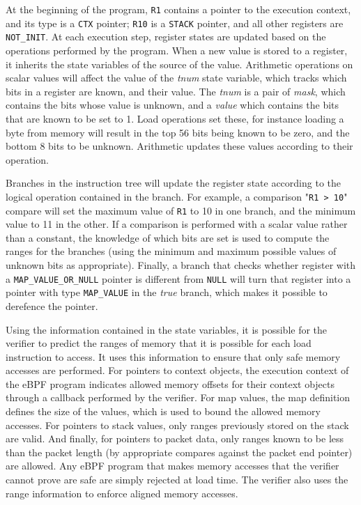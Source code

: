 \documentclass[10pt,sigconf]{acmart}
\begin{document}
At the beginning of the program, \texttt{R1} contains a pointer to the execution
context, and its type is a \texttt{CTX} pointer; \texttt{R10} is a \texttt{STACK}
pointer, and all other registers are \texttt{NOT\_INIT}. At each execution step,
register states are updated based on the operations performed by the program.
When a new value is stored to a register, it inherits the state variables of the
source of the value. Arithmetic operations on scalar values will affect the
value of the \emph{tnum} state variable, which tracks which bits in a register
are known, and their value. The \emph{tnum} is a pair of \emph{mask}, which
contains the bits whose value is unknown, and a \emph{value} which contains the
bits that are known to be set to 1. Load operations set these, for instance
loading a byte from memory will result in the top 56 bits being known to be
zero, and the bottom 8 bits to be unknown. Arithmetic updates these values
according to their operation.

Branches in the instruction tree will update the register state according to the
logical operation contained in the branch. For example, a comparison "\texttt{R1
  > 10}" compare will set the maximum value of \texttt{R1} to 10 in one branch,
and the minimum value to 11 in the other. If a comparison is performed with a
scalar value rather than a constant, the knowledge of which bits are set is used
to compute the ranges for the branches (using the minimum and maximum possible
values of unknown bits as appropriate). Finally, a branch that checks whether
register with a \texttt{MAP\_VALUE\_OR\_NULL} pointer is different from
\texttt{NULL} will turn that register into a pointer with type
\texttt{MAP\_VALUE} in the \emph{true} branch, which makes it possible to
derefence the pointer.

Using the information contained in the state variables, it is possible for the
verifier to predict the ranges of memory that it is possible for each load
instruction to access. It uses this information to ensure that only safe memory
accesses are performed. For pointers to context objects, the execution context
of the eBPF program indicates allowed memory offsets for their context objects
through a callback performed by the verifier. For map values, the map definition
defines the size of the values, which is used to bound the allowed memory
accesses. For pointers to stack values, only ranges previously stored on the
stack are valid. And finally, for pointers to packet data, only ranges known to
be less than the packet length (by appropriate compares against the packet end
pointer) are allowed. Any eBPF program that makes memory accesses that the
verifier cannot prove are safe are simply rejected at load time. The verifier
also uses the range information to enforce aligned memory accesses.
\end{document}
